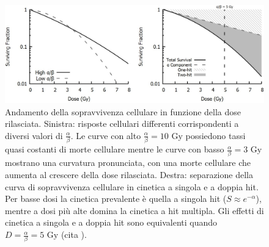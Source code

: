 \documentclass[12pt,a4paper,twoside]{report}
\begin{document}
	\begin{figure}[H]
		\centering
		\includegraphics[width=0.9\linewidth]{images/survival_cell.jpg}
		\caption{Andamento della sopravvivenza cellulare in funzione della dose rilasciata. Sinistra: risposte cellulari differenti corrispondenti a diversi valori di $\frac{\alpha}{\beta}$. Le curve con alto $\frac{\alpha}{\beta}=10\mbox{ Gy}$ possiedono tassi quasi costanti di morte cellulare mentre le curve con basso $\frac{\alpha}{\beta}=3\mbox{ Gy}$ mostrano una curvatura pronunciata, con una morte cellulare che aumenta al crescere della dose rilasciata. Destra: separazione della curva di sopravvivenza cellulare in cinetica a singola e a doppia hit. Per basse dosi la cinetica prevalente è quella a singola hit ($S\approx e^{-\alpha}$), mentre a dosi più alte domina la cinetica a hit multipla. Gli effetti di cinetica a singola e a doppia hit sono equivalenti quando $D=\frac{\alpha}{\beta}=5\mbox{ Gy}$ (cita
			).}
		\label{fig:survival_cell}
	\end{figure}
		
\end{document}
